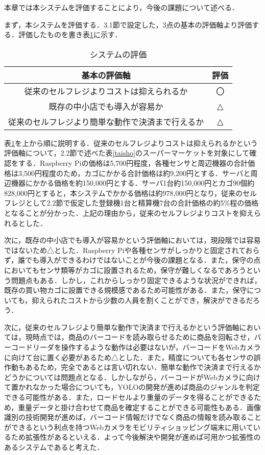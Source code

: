 
本章では本システムを評価することにより，今後の課題について述べる．

まず，本システムを評価する．3.1節で設定した，3点の基本の評価軸より評価する．評価したものを書き表\ref{hyouka}に示す．

\begin{table}[htb]
\begin{center}
\caption{システムの評価}
\begin{tabular}{|c|c|} \hline
基本の評価軸 & 評価 \\ \hline \hline
従来のセルフレジよりコストは抑えられるか & 〇 \\
既存の中小店でも導入が容易か & △ \\
従来のセルフレジより簡単な動作で決済まで行えるか & △\\ \hline
\end{tabular}
\label{hyouka}
\end{center}
\end{table}

表\ref{hyouka}を上から順に説明する．従来のセルフレジよりコストは抑えられるかという評価軸について，2.2節で述べた表\ref{taisho}のスーパーマーケットを対象にして確認をする．Raspberry Piの価格は5,700円程度，各種センサと周辺機器の合計価格は3,500円程度のため，カゴにかかる合計価格は約9,200円とする．サーバと周辺機器にかかる価格を約150,000円とする．サーバ1台約150,000円とカゴ90個約828,000円とすると，本システムでかかる価格は約978,000円となり，従来のセルフレジとして2.2節で仮定した登録機1台と精算機7台の合計価格の約5\%程の価格となることが分かった．上記の理由から，従来のセルフレジよりコストを抑えられるとした．

次に，既存の中小店でも導入が容易かという評価軸においては，現段階では容易ではないため△とした．Raspberry Piや各種センサがしっかりと固定されておらず，誰でも導入ができるわけではないことが今後の課題となる．また，保守の点においてもセンサ類等がカゴに設置されるため，保守が難しくなるであろうという問題点もある．しかし，これからしっかり固定できるような状況ができれば，既存の買い物カゴに設置できる規模感であるため可能性がある．また，保守についても，抑えられたコストから少数の人員を割くことができ，解決ができるだろう．

次に，従来のセルフレジより簡単な動作で決済まで行えるかという評価軸においては，現時点では，商品のバーコードを読み取らせるために商品を回転させ，バーコードリーダを操作するような動作は必要はないが，バーコードをWebカメラに向けて台に置く必要があるため△とした．また，精度についても各センサの誤作動もあるため，完全であるとは言い切れない．簡単な動作で決済まで行えるかどうかについては問題点となる．しかしながら，バーコードがWebカメラに向けて置かれなかった場合についても，YOLOの開発が進めば商品のジャンルを判定できる可能性がある．また，ロードセルより重量のデータを得ることができるため，重量データと掛け合わせて商品を確定することができる可能性もある．画像識別の技術開発が進めば，バーコード情報だけでなく商品の情報を読み取ることができるという利点を持つWebカメラをモビリティショッピング端末に用いているため拡張性があるといえる．よって今後解決や開発が進めば可用かつ拡張性のあるシステムであると考えた．

